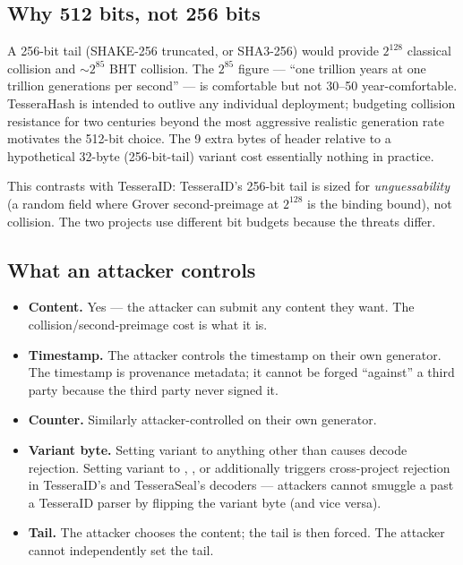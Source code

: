 \subsection{Why 512 bits, not 256 bits}

A 256-bit tail (SHAKE-256 truncated, or SHA3-256) would provide $2^{128}$ classical collision and $\sim 2^{85}$ BHT collision. The $2^{85}$ figure --- ``one trillion years at one trillion generations per second'' --- is comfortable but not 30--50 year-comfortable. TesseraHash is intended to outlive any individual deployment; budgeting collision resistance for two centuries beyond the most aggressive realistic generation rate motivates the 512-bit choice. The 9 extra bytes of header relative to a hypothetical 32-byte (256-bit-tail) variant cost essentially nothing in practice.

This contrasts with TesseraID: TesseraID's 256-bit tail is sized for \emph{unguessability} (a random field where Grover second-preimage at $2^{128}$ is the binding bound), not collision. The two projects use different bit budgets because the threats differ.

\subsection{What an attacker controls}

\begin{itemize}
  \item \textbf{Content.} Yes --- the attacker can submit any content they want. The collision/second-preimage cost is what it is.
  \item \textbf{Timestamp.} The attacker controls the timestamp on their own generator. The timestamp is provenance metadata; it cannot be forged ``against'' a third party because the third party never signed it.
  \item \textbf{Counter.} Similarly attacker-controlled on their own generator.
  \item \textbf{Variant byte.} Setting variant to anything other than  causes decode rejection. Setting variant to , , or  additionally triggers cross-project rejection in TesseraID's and TesseraSeal's decoders --- attackers cannot smuggle a \tesserahash{} past a TesseraID parser by flipping the variant byte (and vice versa).
  \item \textbf{Tail.} The attacker chooses the content; the tail is then forced. The attacker cannot independently set the tail.
\end{itemize}

